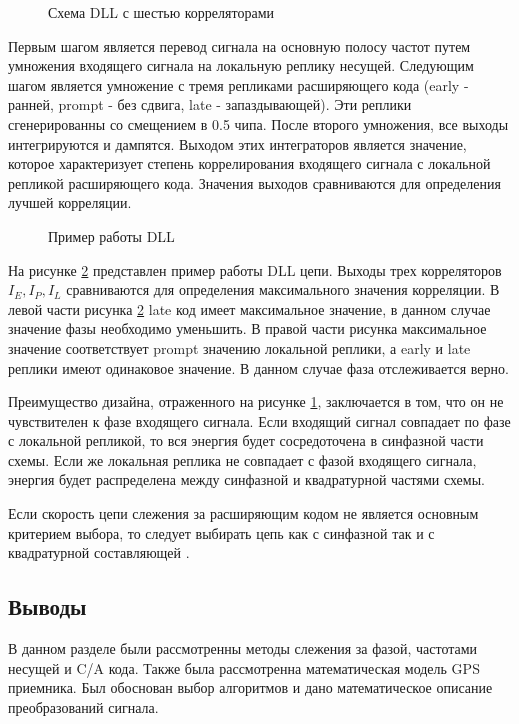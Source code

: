 \begin{figure}[h]
\begin{center}
\end{center}
\caption{Схема DLL с шестью корреляторами}
\label{pic:dll}
\end{figure}

Первым шагом является перевод сигнала на основную полосу частот путем умножения входящего сигнала на локальную реплику
несущей. Следующим шагом является умножение с тремя репликами расширяющего кода (early - ранней, prompt - без сдвига, late - запаздывающей).
Эти реплики сгенерированны со  смещением в 0.5 чипа.
После второго умножения, все выходы интегрируются и дампятся. Выходом этих интеграторов является
значение, которое характеризует степень коррелирования входящего сигнала с локальной репликой расширяющего кода.
Значения выходов сравниваются для определения лучшей корреляции.

\begin{figure}[h]
\begin{center}
\end{center}
\caption{Пример работы DLL}
\label{pic:DLL_cor}
\end{figure}

На рисунке \ref{pic:DLL_cor} представлен пример работы DLL цепи. Выходы трех корреляторов ${I_E, I_P, I_L}$ сравниваются для определения
максимального значения корреляции. В левой части рисунка \ref{pic:DLL_cor} late код имеет максимальное значение, в данном случае значение
фазы необходимо уменьшить. В правой части рисунка максимальное значение соответствует prompt значению локальной реплики, а early и late
реплики имеют одинаковое значение. В данном случае фаза отслеживается верно.

Преимущество дизайна, отраженного на рисунке \ref{pic:dll}, заключается в том, что он не чувствителен к фазе входящего
сигнала. Если входящий сигнал совпадает по фазе с локальной репликой, то вся энергия будет сосредоточена в 
синфазной части схемы. Если же локальная реплика не совпадает с фазой входящего сигнала, энергия будет
распределена между синфазной и квадратурной частями схемы.

Если скорость цепи слежения за расширяющим кодом не является основным критерием выбора, то следует выбирать
цепь как с синфазной так и с квадратурной составляющей \cite{gps}.

\subsection*{Выводы}
В данном разделе были рассмотренны методы слежения за фазой, частотами несущей и C/A кода. Также была рассмотренна математическая модель
GPS приемника. Был обоснован выбор алгоритмов и дано математическое описание преобразований сигнала.

\newpage

